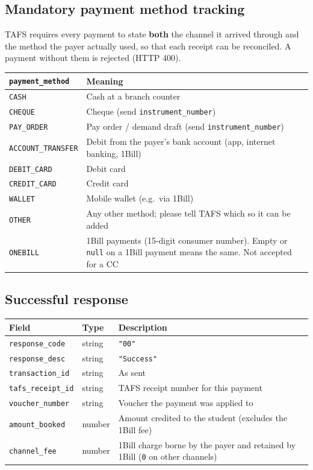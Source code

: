 \documentclass[11pt]{article}
\begin{document}
\subsection{Mandatory payment method tracking}\label{sec:method}
TAFS requires every payment to state \textbf{both} the channel it arrived through and the method the
payer actually used, so that each receipt can be reconciled. A payment without them is rejected
(HTTP 400).
\begin{center}
\begin{tabularx}{\textwidth}{@{}l L@{}}
\toprule
\texttt{payment\_method} & \textbf{Meaning} \\
\midrule
\texttt{CASH} & Cash at a branch counter \\
\texttt{CHEQUE} & Cheque (send \texttt{instrument\_number}) \\
\texttt{PAY\_ORDER} & Pay order / demand draft (send \texttt{instrument\_number}) \\
\texttt{ACCOUNT\_TRANSFER} & Debit from the payer's bank account (app, internet banking, 1Bill) \\
\texttt{DEBIT\_CARD} & Debit card \\
\texttt{CREDIT\_CARD} & Credit card \\
\texttt{WALLET} & Mobile wallet (e.g.\ via 1Bill) \\
\texttt{OTHER} & Any other method; please tell TAFS which so it can be added \\
\texttt{ONEBILL} & 1Bill payments (15-digit consumer number). Empty or \texttt{null} on a 1Bill payment means the same. Not accepted for a CC \\
\bottomrule
\end{tabularx}
\end{center}

\subsection{Successful response}
\begin{longtable}{@{}p{} p{} p{}@{}}
\toprule
\textbf{Field} & \textbf{Type} & \textbf{Description} \\
\midrule
\endhead
\texttt{response\_code} & string & \texttt{"00"} \\
\texttt{response\_desc} & string & \texttt{"Success"} \\
\texttt{transaction\_id} & string & As sent \\
\texttt{tafs\_receipt\_id} & string & TAFS receipt number for this payment \\
\texttt{voucher\_number} & string & Voucher the payment was applied to \\
\texttt{amount\_booked} & number & Amount credited to the student (excludes the 1Bill fee) \\
\texttt{channel\_fee} & number & 1Bill charge borne by the payer and retained by 1Bill (\texttt{0} on other channels) \\
\bottomrule
\end{longtable}
\end{document}
